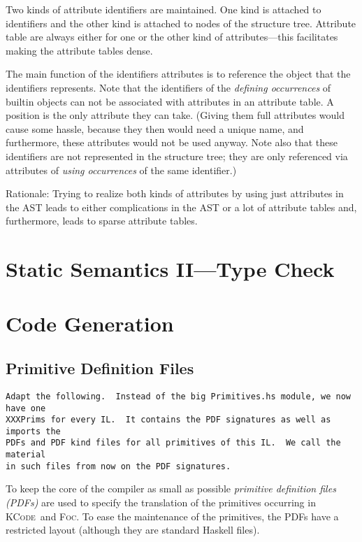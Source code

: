 \documentclass{report}
\newcommand{\FOC}{\textsc{Foc}}
\newcommand{\KCode}{\textsc{KCode}}
\begin{document}
Two kinds of attribute identifiers are maintained. One kind is attached to
identifiers and the other kind is attached to nodes of the structure
tree. Attribute table are always either for one or the other kind of
attributes---this facilitates making the attribute tables dense.

The main function of the identifiers attributes is to reference the object
that the identifiers represents.  Note that the identifiers of the
\emph{defining occurrences} of builtin objects can not be associated with
attributes in an attribute table.  A position is the only attribute they can
take.  (Giving them full attributes would cause some hassle, because they then
would need a unique name, and furthermore, these attributes would not be used
anyway.  Note also that these identifiers are not represented in the structure
tree; they are only referenced via attributes of \emph{using occurrences} of
the same identifier.)

Rationale: Trying to realize both kinds of attributes by using just attributes
in the AST leads to either complications in the AST or a lot of attribute
tables and, furthermore, leads to sparse attribute tables.

\chapter{Static Semantics II---Type Check}
\label{cha:static2}


\chapter{Code Generation}
\label{cha:codegen}

\section{Primitive Definition Files}
\label{sec:pdf}

\begin{verbatim}
Adapt the following.  Instead of the big Primitives.hs module, we now have one
XXXPrims for every IL.  It contains the PDF signatures as well as imports the
PDFs and PDF kind files for all primitives of this IL.  We call the material
in such files from now on the PDF signatures.
\end{verbatim}

To keep the core of the compiler as small as possible \emph{primitive
  definition files (PDFs)} are used to specify the translation of the
primitives occurring in \KCode\ and \FOC.  To ease the maintenance of the
primitives, the PDFs have a restricted layout (although they are standard
Haskell files).
\end{document}
